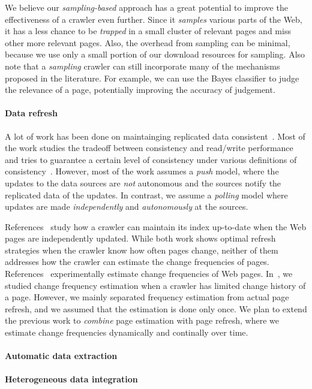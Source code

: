 We believe our {\em sampling-based} approach 
has a great potential to improve the effectiveness of a crawler even
further. Since it {\em samples} various parts of the Web,
it has a less chance to be {\em trapped} in a small cluster of relevant
pages and miss other more relevant pages. Also, the overhead from sampling
can be minimal, because we use only a small portion of our download
resources for sampling. Also note that
a {\em sampling} crawler can still incorporate many of the mechanisms 
proposed in the literature. For example, we can use the Bayes classifier
to judge the relevance of a page, potentially improving the accuracy of 
judgement.


\paragraph{Data refresh}
A lot of work has been done on maintainging 
replicated data consistent~\cite{bern84,alon90,
bern80,barb92,carv82,colby97,krish91,krish94,ladin92,olston00}. 
Most of the work studies the 
tradeoff between consistency and read/write 
performance~\cite{krish94,ladin92,alon90,olston00}
and tries to guarantee a certain level of consistency
under various definitions of consistency~\cite{alon90,barb92,bern80}. 
However, most of the work assumes a {\em push} model,
where the updates to the data sources are {\em not} autonomous 
and the sources notify the replicated data of the updates. 
In contrast, we assume a {\em polling} model where
updates are made {\em independently} and {\em autonomously} at the sources.

References~\cite{coff97,cho00a} study how a crawler can maintain its index
up-to-date when the Web pages are independently updated. While 
both work shows optimal refresh strategies when the crawler know how often
pages change, neither of them addresses how the crawler can estimate the change
frequencies of pages. 
References~\cite{wolman99,evol-att,evol-cache,BC2000,cho00b} 
experimentally estimate change frequencies
of Web pages. In~\cite{cho01a}, we studied change frequency estimation
when a crawler has limited change history of a page.
However, we mainly separated frequency estimation 
from actual page refresh, and we assumed that the estimation is done
only once. We plan to extend the previous work to {\em combine} 
page estimation with page refresh, where we estimate change frequencies
dynamically and continally over time.

\paragraph{Automatic data extraction}

\paragraph{Heterogeneous data integration}

